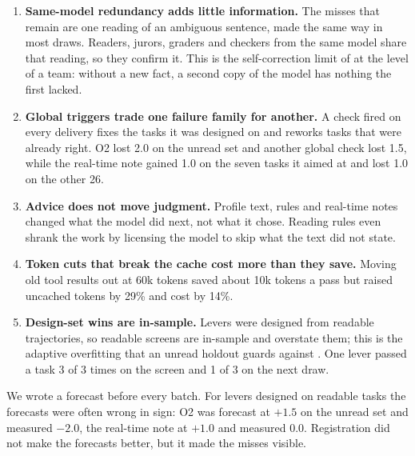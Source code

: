 \begin{enumerate}[leftmargin=1.6em]
  \item \textbf{Same-model redundancy adds little information.} The misses that remain are one
    reading of an ambiguous sentence, made the same way in most draws. Readers, jurors, graders and
    checkers from the same model share that reading, so they confirm it. This is the
    self-correction limit of \citet{huang2024cannot} at the level of a team: without a new fact, a
    second copy of the model has nothing the first lacked.
  \item \textbf{Global triggers trade one failure family for another.} A check fired on every
    delivery fixes the tasks it was designed on and reworks tasks that were already right. O2 lost
    2.0 on the unread set and another global check lost 1.5, while the real-time note gained 1.0
    on the seven tasks it aimed at and lost 1.0 on the other 26.
  \item \textbf{Advice does not move judgment.} Profile text, rules and real-time notes changed
    what the model did next, not what it chose. Reading rules even shrank the work by licensing the
    model to skip what the text did not state.
  \item \textbf{Token cuts that break the cache cost more than they save.} Moving old tool results
    out at 60k tokens saved about 10k tokens a pass but raised uncached tokens by 29\% and cost by
    14\%.
  \item \textbf{Design-set wins are in-sample.} Levers were designed from readable trajectories, so
    readable screens are in-sample and overstate them; this is the adaptive overfitting that an
    unread holdout guards against \citep{dwork2015reusable}. One lever passed a task 3 of 3 times on
    the screen and 1 of 3 on the next draw.
\end{enumerate}

 We wrote a forecast before every batch. For
levers designed on readable tasks the forecasts were often wrong in sign: O2 was forecast at
$+1.5$ on the unread set and measured $-2.0$, the real-time note at $+1.0$ and measured $0.0$.
Registration did not make the forecasts better, but it made the misses visible.

